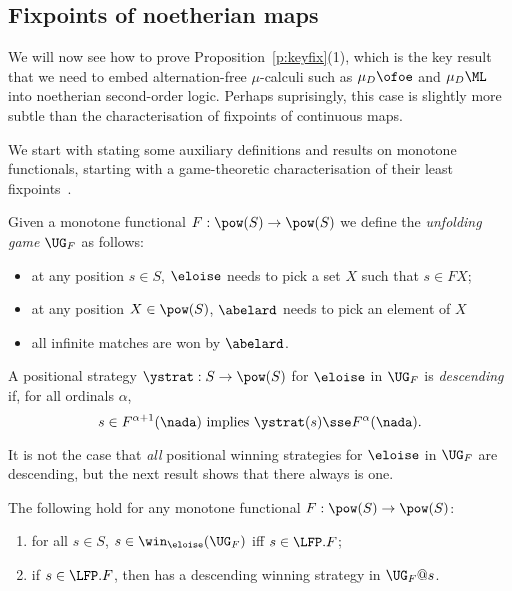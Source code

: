 \subsection{Fixpoints of noetherian maps}

We will now see how to prove Proposition~\ref{p:keyfix}(1), which is the key 
result that we need to embed alternation-free $\mu$-calculi such as 
$\mu_{D}\ofoe$ and $\mu_{D}\ML$ into noetherian second-order logic.
Perhaps suprisingly, this case is slightly more subtle than the characterisation of
fixpoints of continuous maps.

We start with stating some auxiliary definitions and results on monotone 
functionals, starting with a game-theoretic characterisation of their least
fixpoints~\cite{Ven08}.

\begin{definition}
\label{d:unfgame}
Given a monotone functional $F: \pow(S)\to \pow(S)$ we define the 
\emph{unfolding game} $\UG_{F}$ as follows:
\begin{itemize}
\item at any position $s \in S$, $\eloise$ needs to pick a set $X$ such that 
$s \in FX$;
\item at any position $X \in \pow(S)$, $\abelard$ needs to pick an element of 
$X$
\item all infinite matches are won by $\abelard$.
\end{itemize}
A positional strategy $\ystrat: S \to \pow(S)$ for $\eloise$ in $\UG_{F}$ is 
\emph{descending} if, for all ordinals $\alpha$,
\begin{equation}
\label{eq:dec}
s \in F^{\alpha+1}(\nada) \text{ implies } \ystrat(s) \sse F^{\alpha}(\nada).
\end{equation}
\end{definition}

It is not the case that \emph{all} positional winning strategies for $\eloise$ 
in $\UG_{F}$ are descending, but the next result shows that there always is one.

\begin{proposition}
\label{p:unfg}
The following hold for any monotone functional $F: \pow(S)\to \pow(S)$:
\begin{enumerate}[(1)]
\item
for all $s \in S$, $s \in \win_{\eloise}(\UG_{F})$ iff $s \in \LFP. F$;
\item if $s \in \LFP. F$, then \eloise has a descending winning strategy in 
$\UG_{F}@s$.
\end{enumerate}
\end{proposition}


